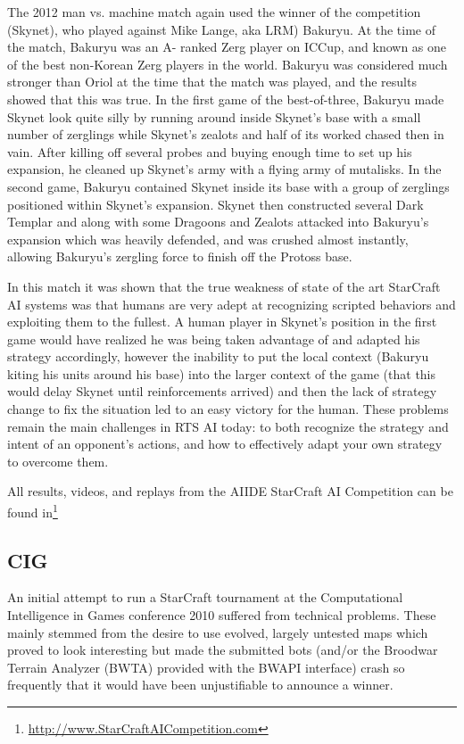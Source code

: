 \documentclass[journal]{IEEEtran}
\begin{document}
The 2012 man vs. machine match again used the winner of the competition (Skynet), who played against
Mike Lange, aka LRM) Bakuryu. At the time of the match, Bakuryu was an A- ranked Zerg player on ICCup,
and known as one of the best non-Korean Zerg players in the world. Bakuryu was considered much
stronger than Oriol at the time that the match was played, and the results showed that this was true.
In the first game of the best-of-three, Bakuryu made Skynet look quite silly by running around inside
Skynet's base with a small number of zerglings while Skynet's zealots and half of its worked chased
then in vain. After killing off several probes and buying enough time to set up his expansion, he
cleaned up Skynet's army with a flying army of mutalisks. In the second game, Bakuryu contained Skynet
inside its base with a group of zerglings positioned within Skynet's expansion. Skynet then constructed
several Dark Templar and along with some Dragoons and Zealots attacked into Bakuryu's expansion which
was heavily defended, and was crushed almost instantly, allowing Bakuryu's zergling force to finish
off the Protoss base. 

In this match it was shown that the true weakness of state of the art StarCraft AI systems was that
humans are very adept at recognizing scripted behaviors and exploiting them to the fullest. A human
player in Skynet's position in the first game would have realized he was being taken advantage of and
adapted his strategy accordingly, however the inability to put the local context (Bakuryu kiting his
units around his base) into the larger context of the game (that this would delay Skynet until
reinforcements arrived) and then the lack of strategy change to fix the situation led to an easy
victory for the human. These problems remain the main challenges in RTS AI today: to both recognize
the strategy and intent of an opponent's actions, and how to effectively adapt your own strategy to 
overcome them.

All results, videos, and replays from the AIIDE StarCraft AI Competition can be found in\footnote{\url{http://www.StarCraftAICompetition.com}}



\subsection{CIG}
\label{sec:cig2011}

An initial attempt to run a StarCraft tournament at the Computational
Intelligence in Games conference 2010 suffered from technical problems.
These mainly stemmed from the desire to use evolved, largely untested
maps which proved to look interesting but made the submitted bots 
(and/or the Broodwar Terrain Analyzer (BWTA) provided with the BWAPI interface) crash
so frequently that it would have been unjustifiable to announce a winner.
\end{document}
